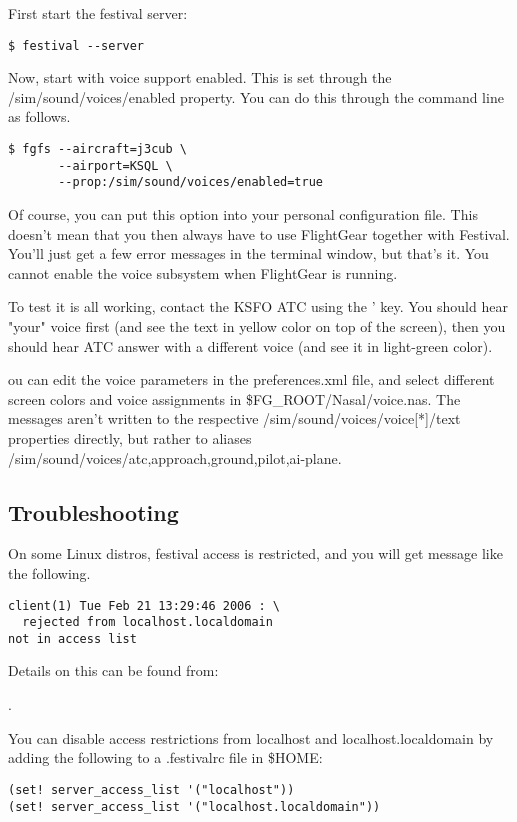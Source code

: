 First start the festival server:

\begin{verbatim}
$ festival --server
\end{verbatim}

Now, start \FlightGear{} with voice support enabled. This is set through the
/sim/sound/voices/enabled property. You can do this through the command line as follows.

\begin{verbatim}
$ fgfs --aircraft=j3cub \
       --airport=KSQL \
       --prop:/sim/sound/voices/enabled=true
\end{verbatim}

Of course, you can put this option into your personal configuration file.
This doesn't mean that you then always have to use FlightGear together with Festival.
You'll just get a few error messages in the terminal window, but that's it. You cannot enable
the voice subsystem when FlightGear is running.

To test it is all working, contact the KSFO ATC using the ' key. You should hear "your"
voice first (and see the text in yellow color on top of the screen), then you should hear
ATC answer with a different voice (and see it in light-green color).

ou can edit the voice parameters in the preferences.xml file, and select different screen colors
and voice assignments in \$FG\_ROOT/Nasal/voice.nas. The messages aren't written to the
respective /sim/sound/voices/voice[*]/text properties directly, but rather to aliases
/sim/sound/voices/{atc,approach,ground,pilot,ai-plane}.

\subsection{Troubleshooting}

On some Linux distros, festival access is restricted, and you will get message like the following.

\begin{verbatim}
client(1) Tue Feb 21 13:29:46 2006 : \
  rejected from localhost.localdomain
not in access list
\end{verbatim}

Details on this can be found from:

.

You can disable access restrictions from localhost and localhost.localdomain by adding
the following to a .festivalrc file in \$HOME:
\begin{verbatim}
(set! server_access_list '("localhost"))
(set! server_access_list '("localhost.localdomain"))
\end{verbatim}

